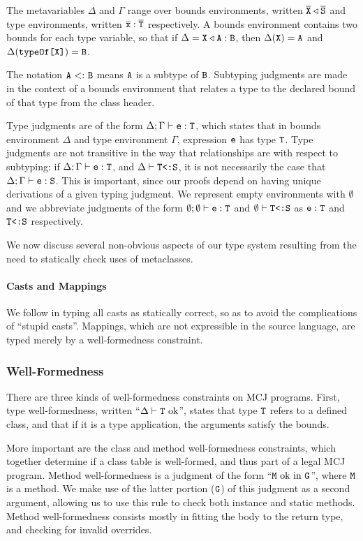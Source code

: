 \documentclass[nocopyrightspace,10pt]{acm-sigplan}
\begin{document}
The metavariables $\Delta$ and $\Gamma$ range over bounds
environments, written ${\overline{{\mbox {\tt X}}}} \triangleleft {\overline{{\mbox {\tt S}}}}$ and type environments,
written ${{\overline{{\mbox {\tt x}}}}} : {{\overline{{\mathtt{{T}}}}}}$ respectively.  A bounds environment contains
two bounds for each type variable, so that if $\Delta = \mbox {\tt X} \triangleleft
\mbox {\tt A} : \mbox {\tt B}$, then $\Delta(\mbox {\tt X}) = \mbox {\tt A}$ and $\Delta({\mathtt{{typeOf}}{\mbox{\tt [}}\mbox {\tt X}\mbox{{\tt ]}}}) = \mbox {\tt B}$.

The notation $\mbox {\tt A} {\ <:\ } \mbox {\tt B}$ means $\mbox {\tt A}$ is a subtype of $\mbox {\tt B}$.
Subtyping judgments are made in the context of a bounds environment
that relates a type to the declared bound of that type from the class
header.

Type judgments are of the form ${\Delta;\Gamma} \vdash {\ensuremath{{\mbox {\tt e}} : {\mathtt{{T}}}}}$, which states
that in bounds environment $\Delta$ and type environment $\Gamma$,
expression $\mbox {\tt e}$ has type $\mathtt{{T}}$.  Type judgments are not transitive in
the way that {} relationships are with respect to
subtyping: if ${\Delta;\Gamma} \vdash {\ensuremath{{\mbox {\tt e}} : {\mathtt{{T}}}}}$, and ${\Delta} \vdash {\ensuremath{{\mathtt{{T}}} \mbox{\tt <:} {\mbox {\tt S}}}}$, it is not necessarily the case that ${\Delta;\Gamma} \vdash {\ensuremath{{\mbox {\tt e}} : {\mbox {\tt S}}}}$.
This is important, since our proofs depend on having unique
derivations of a given typing judgment. We represent empty
environments with $\emptyset$ and we abbreviate judgments of the form
${\emptyset;\emptyset} \vdash {\ensuremath {{\mbox {\tt e}} : {\mathtt{{T}}}}}$ and ${\emptyset} \vdash {\ensuremath {{\mathtt{{T}}} \mbox{\tt <:} {\mbox {\tt S}}}}$ as ${{\mbox {\tt e}} : {\mathtt{{T}}}}$ and ${{\mathtt{{T}}} \mbox{\tt <:} {\mbox {\tt S}}}$ respectively.

We now discuss several non-obvious aspects of our type system
resulting from the need to statically check uses of metaclasses.


\paragraph{Casts and Mappings}
We follow \cite{MixGen} in typing all casts as statically correct, so as to
avoid the complications of ``stupid casts''.  Mappings, which are not
expressible in the source language, are typed merely by a
well-formedness constraint.

\subsubsection{Well-Formedness}

There are three kinds of well-formedness constraints on MCJ
programs.  First, type well-formedness, written ``${\Delta} \vdash {\ensuremath{\mathtt{{T}}}} \mbox{\textrm {\ ok}}$'',
states that type $\mathtt{{T}}$ refers to a defined class, and that if it is a type
application, the arguments satisfy the bounds.

More important are the class and method well-formedness constraints,
which together determine if a class table is well-formed, and thus
part of a legal MCJ program.  Method well-formedness is a
judgment of the form ``$\mbox {\tt M} \mbox{\ ok in}\ \mathtt{{G}}$'', where $\mbox {\tt M}$ is a method.  We make
use of the latter portion ($\mathtt{{G}}$) of this judgment as a second argument,
allowing us to use this rule to check both instance and static methods.
Method well-formedness consists mostly in fitting the body to the
return type, and checking for invalid overrides.
\end{document}

